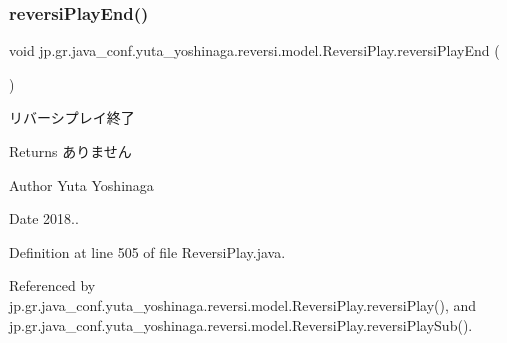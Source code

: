 \mbox{\label{classjp_1_1gr_1_1java__conf_1_1yuta__yoshinaga_1_1reversi_1_1model_1_1_reversi_play_abd208c350d3713ef6872faaa813ac8c3}} 
\subsubsection{\texorpdfstring{reversi\+Play\+End()}{reversiPlayEnd()}}
{\footnotesize\ttfamily void jp.\+gr.\+java\+\_\+conf.\+yuta\+\_\+yoshinaga.\+reversi.\+model.\+Reversi\+Play.\+reversi\+Play\+End (\begin{DoxyParamCaption}{ }\end{DoxyParamCaption})}



リバーシプレイ終了 

\begin{DoxyReturn}{Returns}
ありません 
\end{DoxyReturn}
\begin{DoxyAuthor}{Author}
Yuta Yoshinaga 
\end{DoxyAuthor}
\begin{DoxyDate}{Date}
2018.. 
\end{DoxyDate}


Definition at line 505 of file Reversi\+Play.\+java.



Referenced by jp.\+gr.\+java\+\_\+conf.\+yuta\+\_\+yoshinaga.\+reversi.\+model.\+Reversi\+Play.\+reversi\+Play(), and jp.\+gr.\+java\+\_\+conf.\+yuta\+\_\+yoshinaga.\+reversi.\+model.\+Reversi\+Play.\+reversi\+Play\+Sub().

